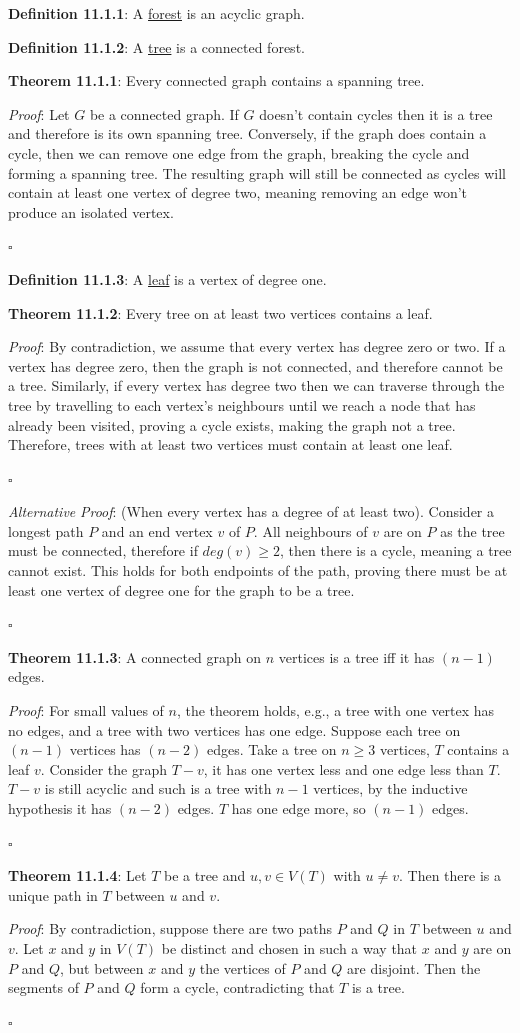 \documentclass{article}
\newcommand{\separate}[1] {\vspace{#1 pt}\noindent}
\newcommand{\definition}[2]{\textbf{Definition #1}: #2\label{def:#1}}
\newcommand{\proof}[2]{\textit{Proof}: #2 \begin{flushright}\(\square\)\end{flushright}\label{prf:#1}}
\newcommand{\theorem}[3]{\textbf{Theorem #1}: #2 \par\separate{3}\proof{thm:#1}{#3}\label{thm:#1}}
\begin{document}
\definition{11.1.1}{A \underline{forest} is an acyclic graph.}

\separate{5}\definition{11.1.2}{A \underline{tree} is a connected forest.}

\separate{5}\theorem{11.1.1}{Every connected graph contains a spanning tree.}{Let \(G\) be a connected graph. If \(G\) doesn't contain cycles then it is a tree and therefore is its own spanning tree. Conversely, if the graph does contain a cycle, then we can remove one edge from the graph, breaking the cycle and forming a spanning tree. The resulting graph will still be connected as cycles will contain at least one vertex of degree two, meaning removing an edge won't produce an isolated vertex.}

\newpage\noindent\definition{11.1.3}{A \underline{leaf} is a vertex of degree one.}

\separate{5}\theorem{11.1.2}{Every tree on at least two vertices contains a leaf.}{By contradiction, we assume that every vertex has degree zero or two. If a vertex has degree zero, then the graph is not connected, and therefore cannot be a tree. Similarly, if every vertex has degree two then we can traverse through the tree by travelling to each vertex's neighbours until we reach a node that has already been visited, proving a cycle exists, making the graph not a tree. Therefore, trees with at least two vertices must contain at least one leaf.}
\textit{Alternative }\proof{alt:thm:11.1.2}{(When every vertex has a degree of at least two). Consider a longest path \(P\) and an end vertex \(v\) of \(P\). All neighbours of \(v\) are on \(P\) as the tree must be connected, therefore if \(deg(v) \geq 2\), then there is a cycle, meaning a tree cannot exist. This holds for both endpoints of the path, proving there must be at least one vertex of degree one for the graph to be a tree.}

\separate{5}\theorem{11.1.3}{A connected graph on \(n\) vertices is a tree iff it has \((n-1)\) edges.}
{For small values of \(n\), the theorem holds, e.g., a tree with one vertex has no edges, and a tree with two vertices has one edge. Suppose each tree on \((n-1)\) vertices has \((n-2)\) edges. Take a tree on \(n \geq 3\) vertices, \(T\) contains a leaf \(v\). Consider the graph \(T-v\), it has one vertex less and one edge less than \(T\). \(T-v\) is still acyclic and such is a tree with \(n-1\) vertices, by the inductive hypothesis it has \((n-2)\) edges. \(T\) has one edge more, so \((n-1)\) edges.}

\separate{5}\theorem{11.1.4}{Let \(T\) be a tree and \(u,v \in V(T)\) with \(u \neq v\). Then there is a unique path in \(T\) between \(u\) and \(v\).}
{By contradiction, suppose there are two paths \(P\) and \(Q\) in \(T\) between \(u\) and \(v\). Let \(x\) and \(y\) in \(V(T)\) be distinct and chosen in such a way that \(x\) and \(y\) are on \(P\) and \(Q\), but between \(x\) and \(y\) the vertices of \(P\) and \(Q\) are disjoint. Then the segments of \(P\) and \(Q\) form a cycle, contradicting that \(T\) is a tree.}
\end{document}

